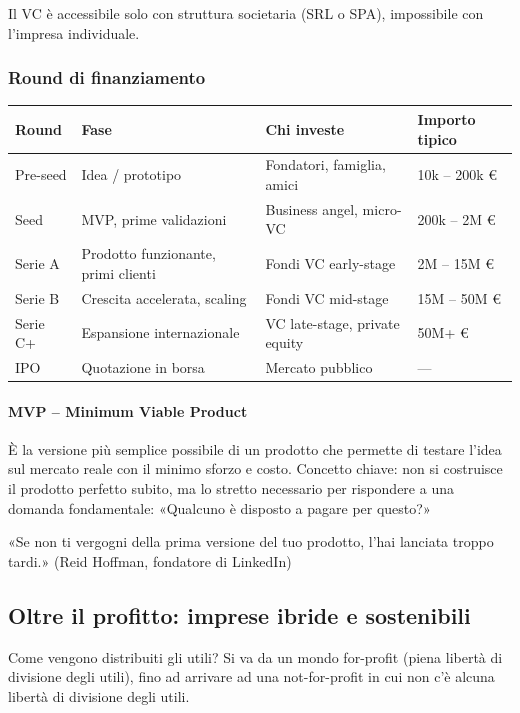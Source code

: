 \documentclass[a4paper,12pt]{article}
\begin{document}
	Il VC è accessibile solo con struttura societaria (SRL o SPA), impossibile con l'impresa individuale.
	
	\subsubsection{Round di finanziamento}
	
	\begin{table}[h]
		\centering
		\begin{tabular}{|l|l|l|l|}
			\hline
			\textbf{Round} & \textbf{Fase} & \textbf{Chi investe} & \textbf{Importo tipico} \\
			\hline
			Pre-seed & Idea / prototipo & Fondatori, famiglia, amici & 10k -- 200k € \\
			Seed & MVP, prime validazioni & Business angel, micro-VC & 200k -- 2M € \\
			Serie A & Prodotto funzionante, primi clienti & Fondi VC early-stage & 2M -- 15M € \\
			Serie B & Crescita accelerata, scaling & Fondi VC mid-stage & 15M -- 50M € \\
			Serie C+ & Espansione internazionale & VC late-stage, private equity & 50M+ € \\
			IPO & Quotazione in borsa & Mercato pubblico & --- \\
			\hline
		\end{tabular}
	\end{table}
	
	\paragraph{MVP -- Minimum Viable Product}
	
	È la versione più semplice possibile di un prodotto che permette di testare l'idea sul mercato reale con il minimo sforzo e costo.%
	Concetto chiave: non si costruisce il prodotto perfetto subito, ma lo stretto necessario per rispondere a una domanda fondamentale: «Qualcuno è disposto a pagare per questo?»
	
	«Se non ti vergogni della prima versione del tuo prodotto, l'hai lanciata troppo tardi.» (Reid Hoffman, fondatore di LinkedIn)
	
	\subsection{Oltre il profitto: imprese ibride e sostenibili}
	Come vengono distribuiti gli utili? Si va da un mondo for-profit (piena libertà di divisione degli utili), fino ad arrivare ad una not-for-profit in cui non c'è alcuna libertà di divisione degli utili.
	
\end{document}
